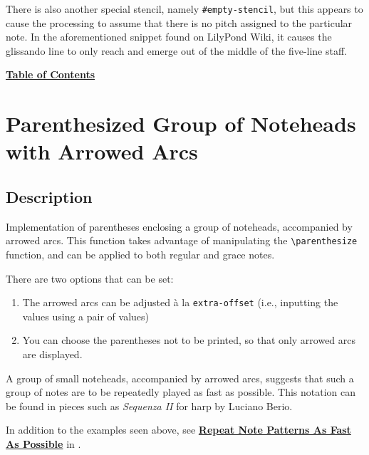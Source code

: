There is also another special stencil, namely \Verb|#empty-stencil|, but this appears to cause the processing to assume that there is no pitch assigned to the particular note. In the aforementioned snippet found on LilyPond Wiki, it causes the glissando line to only reach and emerge out of the middle of the five-line staff.

\par

\hyperref[sec:toc]{\textbf{Table of Contents}}

\vfill \break



\section {Parenthesized Group of Noteheads with Arrowed Arcs}
\hfill

\subsection{Description}
	Implementation of parentheses enclosing a group of noteheads, accompanied by arrowed arcs. This function takes advantage of manipulating the \verb|\parenthesize| function, and can be applied to both regular and grace notes. \par
	There are two options that can be set: 
	\begin{enumerate}
	\item The arrowed arcs can be adjusted \`a la \verb|extra-offset| (i.e., inputting the values using a pair of values)
	\item You can choose the parentheses not to be printed, so that only arrowed arcs are displayed.
	\end{enumerate}
	A group of small noteheads, accompanied by arrowed arcs, suggests that such a group of notes are to be repeatedly played as fast as possible. This notation can be found in pieces such as \textit{Sequenza II} for harp by Luciano Berio. \par
	In addition to the examples seen above, see \hyperref[sec:repeat_notepatterns_afap]{\textbf{Repeat Note Patterns As Fast As Possible}} in .
	
